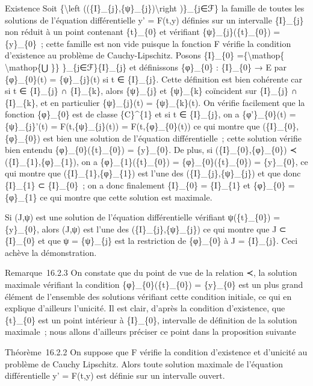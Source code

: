 \documentclass[]{article}
\begin{document}
Existence Soit \{\textbackslash{}left
((\{I\}\_\{j\},\{ψ\}\_\{j\})\textbackslash{}right )\}\_\{j∈ℱ\} la
famille de toutes les solutions de l'équation différentielle y' = F(t,y)
définies sur un intervalle \{I\}\_\{j\} non réduit à un point contenant
\{t\}\_\{0\} et vérifiant \{ψ\}\_\{j\}(\{t\}\_\{0\}) = \{y\}\_\{0\}~;
cette famille est non vide puisque la fonction F vérifie la condition
d'existence au problème de Cauchy-Lipschitz. Posons \{I\}\_\{0\}
=\{\textbackslash{}mathop\{ \textbackslash{}mathop\{⋃ \}\}
\}\_\{j∈ℱ\}\{I\}\_\{j\} et définissons \{φ\}\_\{0\} : \{I\}\_\{0\} → E
par \{φ\}\_\{0\}(t) = \{ψ\}\_\{j\}(t) si t ∈ \{I\}\_\{j\}. Cette
définition est bien cohérente car si t ∈ \{I\}\_\{j\} ∩ \{I\}\_\{k\},
alors \{ψ\}\_\{j\} et \{ψ\}\_\{k\} coïncident sur \{I\}\_\{j\} ∩
\{I\}\_\{k\}, et en particulier \{ψ\}\_\{j\}(t) = \{ψ\}\_\{k\}(t). On
vérifie facilement que la fonction \{φ\}\_\{0\} est de classe
\{C\}\^{}\{1\} et si t ∈ \{I\}\_\{j\}, on a \{φ'\}\_\{0\}(t) =
\{ψ\}\_\{j\}'(t) = F(t,\{ψ\}\_\{j\}(t)) = F(t,\{φ\}\_\{0\}(t)) ce qui
montre que (\{I\}\_\{0\},\{φ\}\_\{0\}) est bien une solution de
l'équation différentielle~; cette solution vérifie bien entendu
\{φ\}\_\{0\}(\{t\}\_\{0\}) = \{y\}\_\{0\}. De plus, si
(\{I\}\_\{0\},\{φ\}\_\{0\}) ≺ (\{I\}\_\{1\},\{φ\}\_\{1\}), on a
\{φ\}\_\{1\}(\{t\}\_\{0\}) = \{φ\}\_\{0\}(\{t\}\_\{0\}) = \{y\}\_\{0\},
ce qui montre que (\{I\}\_\{1\},\{φ\}\_\{1\}) est l'une des
(\{I\}\_\{j\},\{ψ\}\_\{j\}) et que donc \{I\}\_\{1\} ⊂ \{I\}\_\{0\}~; on
a donc finalement \{I\}\_\{0\} = \{I\}\_\{1\} et \{φ\}\_\{0\} =
\{φ\}\_\{1\} ce qui montre que cette solution est maximale.

Si (J,ψ) est une solution de l'équation différentielle vérifiant
ψ(\{t\}\_\{0\}) = \{y\}\_\{0\}, alors (J,ψ) est l'une des
(\{I\}\_\{j\},\{ψ\}\_\{j\}) ce qui montre que J ⊂ \{I\}\_\{0\} et que ψ
= \{ψ\}\_\{j\} est la restriction de \{φ\}\_\{0\} à J = \{I\}\_\{j\}.
Ceci achève la démonstration.

Remarque~16.2.3 On constate que du point de vue de la relation ≺, la
solution maximale vérifiant la condition \{φ\}\_\{0\}(\{t\}\_\{0\}) =
\{y\}\_\{0\} est un plus grand élément de l'ensemble des solutions
vérifiant cette condition initiale, ce qui en explique d'ailleurs
l'unicité. Il est clair, d'après la condition d'existence, que
\{t\}\_\{0\} est un point intérieur à \{I\}\_\{0\}, intervalle de
définition de la solution maximale~; nous allons d'ailleurs préciser ce
point dans la proposition suivante

Théorème~16.2.2 On suppose que F vérifie la condition d'existence et
d'unicité au problème de Cauchy Lipschitz. Alors toute solution maximale
de l'équation différentielle y' = F(t,y) est définie sur un intervalle
ouvert.
\end{document}
